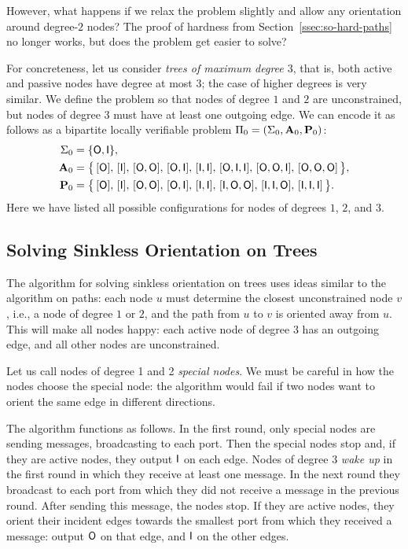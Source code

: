 However, what happens if we relax the problem slightly and allow any orientation around degree-$2$ nodes? The proof of hardness from Section~\ref{ssec:so-hard-paths} no longer works, but does the problem get easier to solve?

For concreteness, let us consider \emph{trees of maximum degree $3$}, that is, both active and passive nodes have degree at most $3$; the case of higher degrees is very similar. We define the problem so that nodes of degree $1$ and $2$ are unconstrained, but nodes of degree $3$ must have at least one outgoing edge. We can encode it as follows as a bipartite locally verifiable problem $\Pi_0 = (\Sigma_0, \mathbf{A}_0, \mathbf{P}_0)$:
\begin{align*}
	\Sigma_0 &= \{ \mathsf{O}, \mathsf{I} \}, \\
	\mathbf{A}_0 &= \bigl\{ \, [\mathsf{O}],\,[\mathsf{I}],\,[\mathsf{O}, \mathsf{O}],\,[\mathsf{O},\mathsf{I}],\,[\mathsf{I},\mathsf{I}],\,[\mathsf{O},\mathsf{I},\mathsf{I}],\,[\mathsf{O},\mathsf{O},\mathsf{I}],\,[\mathsf{O},\mathsf{O},\mathsf{O}] \, \bigr\}, \\
	\mathbf{P}_0 &= \bigl\{ \, [\mathsf{O}],\,[\mathsf{I}],\,[\mathsf{O}, \mathsf{O}],\,[\mathsf{O},\mathsf{I}],\,[\mathsf{I},\mathsf{I}],\,[\mathsf{I},\mathsf{O},\mathsf{O}],\,[\mathsf{I},\mathsf{I},\mathsf{O}],\,[\mathsf{I},\mathsf{I},\mathsf{I}] \, \bigr\}.
\end{align*}
Here we have listed all possible configurations for nodes of degrees $1$, $2$, and $3$.

\subsection{Solving Sinkless Orientation on Trees} \label{ssec:so-trees-alg}

The algorithm for solving sinkless orientation on trees uses ideas similar to the algorithm on paths: each node $u$ must determine the closest unconstrained node $v$, i.e., a node of degree $1$ or $2$, and the path from $u$ to $v$ is oriented away from $u$. This will make all nodes happy: each active node of degree $3$ has an outgoing edge, and all other nodes are unconstrained.

Let us call nodes of degree 1 and 2 \emph{special nodes}. We must be careful in how the nodes choose the special node: the algorithm would fail if two nodes want to orient the same edge in different directions.

The algorithm functions as follows. In the first round, only special nodes are sending messages, broadcasting to each port. Then the special nodes stop and, if they are active nodes, they output $\mathsf{I}$ on each edge. Nodes of degree 3 \emph{wake up} in the first round in which they receive at least one message. In the next round they broadcast to each port from which they did not receive a message in the previous round. After sending this message, the nodes stop. If they are active nodes, they orient their incident edges towards the smallest port from which they received a message: output $\mathsf{O}$ on that edge, and $\mathsf{I}$ on the other edges. 

